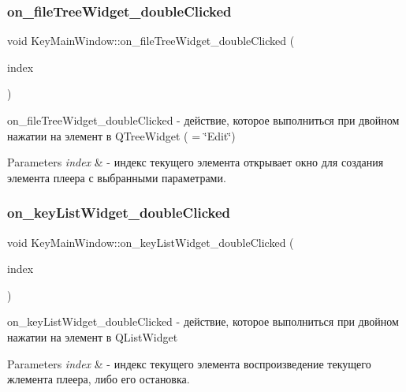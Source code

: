 \subsubsection{\texorpdfstring{on\+\_\+file\+Tree\+Widget\+\_\+double\+Clicked}{on\_fileTreeWidget\_doubleClicked}}
{\footnotesize\ttfamily void Key\+Main\+Window\+::on\+\_\+file\+Tree\+Widget\+\_\+double\+Clicked (\begin{DoxyParamCaption}\item[{const Q\+Model\+Index \&}]{index }\end{DoxyParamCaption})\hspace{0.3cm}{\ttfamily [slot]}}



on\+\_\+file\+Tree\+Widget\+\_\+double\+Clicked -\/ действие, которое выполниться при двойном нажатии на элемент в Q\+Tree\+Widget ( = \char`\"{}\+Edit\char`\"{}) 


\begin{DoxyParams}{Parameters}
{\em index} & -\/ индекс текущего элемента открывает окно для создания элемента плеера с выбранными параметрами. \\
\hline
\end{DoxyParams}
\mbox{\label{class_key_main_window_af82eadd35c704bc554d2465554dc48c0}} 
\subsubsection{\texorpdfstring{on\+\_\+key\+List\+Widget\+\_\+double\+Clicked}{on\_keyListWidget\_doubleClicked}}
{\footnotesize\ttfamily void Key\+Main\+Window\+::on\+\_\+key\+List\+Widget\+\_\+double\+Clicked (\begin{DoxyParamCaption}\item[{const Q\+Model\+Index \&}]{index }\end{DoxyParamCaption})\hspace{0.3cm}{\ttfamily [slot]}}



on\+\_\+key\+List\+Widget\+\_\+double\+Clicked -\/ действие, которое выполниться при двойном нажатии на элемент в Q\+List\+Widget 


\begin{DoxyParams}{Parameters}
{\em index} & -\/ индекс текущего элемента воспроизведение текущего жлемента плеера, либо его остановка. \\
\hline
\end{DoxyParams}
\mbox{\label{class_key_main_window_a7a7856ea2f3e6d5bc6c4411057e64957}} 
